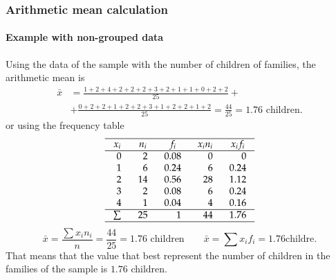 \begin{frame}
\frametitle{Arithmetic mean calculation}
\framesubtitle{Example with non-grouped data}
Using the data of the sample with the number of children of families, the arithmetic mean is 
\begin{align*}
\bar{x} &= \frac{1+2+4+2+2+2+3+2+1+1+0+2+2}{25}+\\
&+\frac{0+2+2+1+2+2+3+1+2+2+1+2}{25} = \frac{44}{25} = 1.76 \mbox{ children}.
\end{align*}
or using the frequency table
\[
\setlength\arraycolsep{3mm}
\setlength\arrayrulewidth{0.5pt}
\begin{array}{rrrrr}
\hline
\multicolumn{1}{c}{x_i} & \multicolumn{1}{c}{n_i} & \multicolumn{1}{c}{f_i} & \multicolumn{1}{c}{x_in_i} & \multicolumn{1}{c}{x_if_i}\\
\hline
0 & 2 & 0.08 & 0 & 0\\
1 & 6 & 0.24 & 6 & 0.24\\
2 & 14 & 0.56 & 28 & 1.12\\
3 & 2  & 0.08 & 6 & 0.24\\
4 & 1 & 0.04 & 4 & 0.16 \\
\hline
\sum & 25 & 1 & 44 & 1.76 \\
\hline
\end{array}
\]
\[
\bar{x} = \frac{\sum x_in_i}{n} = \frac{44}{25}= 1.76\mbox{ children} \qquad \bar{x}=\sum{x_if_i} = 1.76 \mbox{
childre}.
\]
That means that the value that best represent the number of children in the families of the sample is $1.76$ children.
\end{frame}


